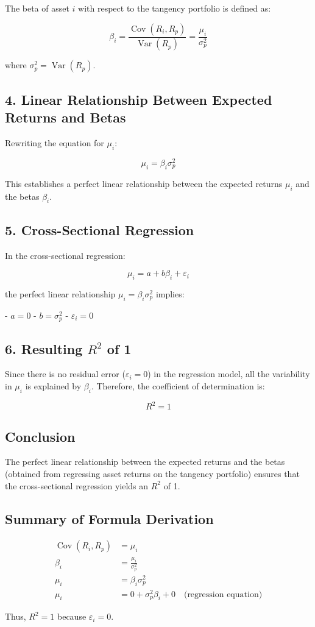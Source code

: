 \documentclass{article}
\begin{document}
The beta of asset \( i \) with respect to the tangency portfolio is defined as:



\[
\beta_i = \frac{\operatorname{Cov}(R_i, R_p)}{\operatorname{Var}(R_p)} = \frac{\mu_i}{\sigma_p^2}
\]

where \( \sigma_p^2 = \operatorname{Var}(R_p) \).

\subsection*{4. Linear Relationship Between Expected Returns and Betas}

Rewriting the equation for \( \mu_i \):

\[
\mu_i = \beta_i \sigma_p^2
\]

This establishes a perfect linear relationship between the expected returns \( \mu_i \) and the betas \( \beta_i \).

\subsection*{5. Cross-Sectional Regression}

In the cross-sectional regression:

\[
\mu_i = a + b \beta_i + \varepsilon_i
\]

the perfect linear relationship \( \mu_i = \beta_i \sigma_p^2 \) implies:

- \( a = 0 \)
- \( b = \sigma_p^2 \)
- \( \varepsilon_i = 0 \)

\subsection*{6. Resulting \( R^2 \) of 1}

Since there is no residual error (\( \varepsilon_i = 0 \)) in the regression model, all the variability in \( \mu_i \) is explained by \( \beta_i \). Therefore, the coefficient of determination is:

\[
R^2 = 1
\]

\subsection*{Conclusion}

The perfect linear relationship between the expected returns and the betas (obtained from regressing asset returns on the tangency portfolio) ensures that the cross-sectional regression yields an \( R^2 \) of 1.

\subsection*{Summary of Formula Derivation}

\begin{align*}
\operatorname{Cov}(R_i, R_p) &= \mu_i \\
\beta_i &= \frac{\mu_i}{\sigma_p^2} \\
\mu_i &= \beta_i \sigma_p^2 \\
\mu_i &= 0 + \sigma_p^2 \beta_i + 0 \quad \text{(regression equation)}
\end{align*}

Thus, \( R^2 = 1 \) because \( \varepsilon_i = 0 \).
\end{document}
